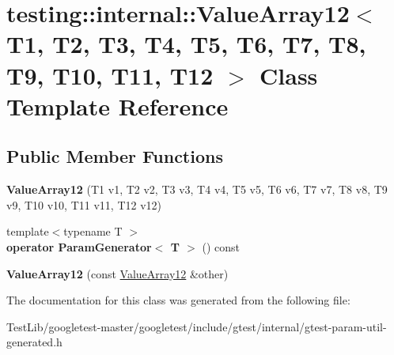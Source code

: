 \hypertarget{classtesting_1_1internal_1_1ValueArray12}{}\section{testing\+:\+:internal\+:\+:Value\+Array12$<$ T1, T2, T3, T4, T5, T6, T7, T8, T9, T10, T11, T12 $>$ Class Template Reference}
\label{classtesting_1_1internal_1_1ValueArray12}
\subsection*{Public Member Functions}
\begin{DoxyCompactItemize}
\item 
\mbox{\label{classtesting_1_1internal_1_1ValueArray12_aaebe12df41b8122fd03f5d6aa1c820a7}} 
{\bfseries Value\+Array12} (T1 v1, T2 v2, T3 v3, T4 v4, T5 v5, T6 v6, T7 v7, T8 v8, T9 v9, T10 v10, T11 v11, T12 v12)
\item 
\mbox{\label{classtesting_1_1internal_1_1ValueArray12_acc840a1c32a10ce160731d66c8105e0b}} 
{\footnotesize template$<$typename T $>$ }\\{\bfseries operator Param\+Generator$<$ T $>$} () const
\item 
\mbox{\label{classtesting_1_1internal_1_1ValueArray12_a901c95791c3b16ca51fcd7fc1323fef2}} 
{\bfseries Value\+Array12} (const \hyperlink{classtesting_1_1internal_1_1ValueArray12}{Value\+Array12} \&other)
\end{DoxyCompactItemize}


The documentation for this class was generated from the following file\+:\begin{DoxyCompactItemize}
\item 
Test\+Lib/googletest-\/master/googletest/include/gtest/internal/gtest-\/param-\/util-\/generated.\+h\end{DoxyCompactItemize}

